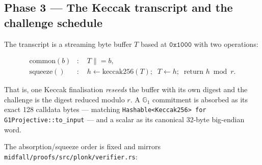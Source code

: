 \documentclass[11pt,a4paper]{article}
\newcommand{\Gone}{\ensuremath{\mathbb{G}_{1}}}
\newcommand{\code}[1]{\texttt{#1}}
\theoremstyle{definition}
\begin{document}
\subsection{Phase 3 --- The Keccak transcript and the challenge schedule}
\label{sec:transcript}

The transcript is a streaming byte buffer $T$ based at $\mathtt{0x1000}$ with
two operations:

\begin{align}
\mathrm{common}(b) &: \quad T \mathrel{\|}= b, \\
\mathrm{squeeze}() &: \quad h \leftarrow \mathrm{keccak256}(T); \;\;
T \leftarrow h; \;\; \text{return } h \bmod r .
\end{align}

That is, one Keccak finalisation \emph{reseeds} the buffer with its own digest
and the challenge is the digest reduced modulo $r$. A $\Gone$ commitment is
absorbed as its exact 128 calldata bytes --- matching
\code{Hashable<Keccak256> for G1Projective::to\_input} --- and a scalar as its
canonical 32-byte big-endian word.

The absorption/squeeze order is fixed and mirrors
\code{midfall/proofs/src/plonk/verifier.rs}:
\end{document}
